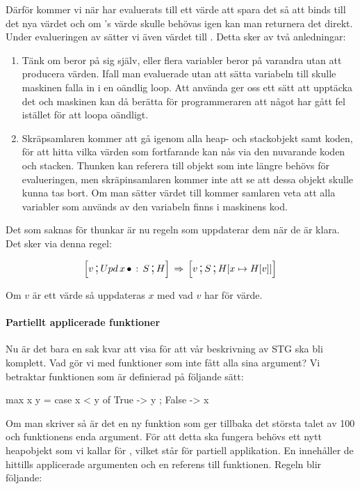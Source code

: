 \documentclass[../Core]{subfiles}
\begin{document}
Därför kommer vi när  har evaluerats till ett värde att spara
det så att  binds till det nya värdet och om 's värde skulle behövas
igen kan man returnera det direkt. Under evalueringen av  sätter
vi även värdet  till . Detta sker av två anledningar:
\begin{enumerate}
\item Tänk om  beror på sig själv, eller flera variabler beror på varandra utan
att producera värden. Ifall man evaluerade utan att sätta variabeln till 
skulle maskinen falla in i en oändlig loop. Att använda  ger oss ett sätt att
upptäcka det och maskinen kan då berätta för programmeraren att något har gått fel
istället för att loopa oändligt.
\item Skräpsamlaren kommer att gå igenom alla heap- och stackobjekt
samt koden, för att hitta vilka värden som fortfarande kan nås via den nuvarande
koden och stacken. Thunken kan referera till objekt som inte längre
behövs för evalueringen, men skräpinsamlaren kommer inte att se att dessa objekt skulle
kunna tas bort. Om man sätter värdet till 
kommer samlaren veta att alla variabler som används av den variabeln finns
i maskinens kod.
\end{enumerate}
Det som saknas för thunkar är nu regeln som uppdaterar dem när de
är klara. Det sker via denna regel:

\[
\text{\large$$}\Big[v \,\text{\Large;}\, Upd\, x\,\bullet \,:\, S \,\text{\Large;}\, H\Big] \,\Rightarrow\, \text{\large$$}\Big[v \,\text{\Large;}\, S \,\text{\Large;}\, H[x\mapsto H[v]]\Big]
\]

Om $v$ är ett värde så uppdateras $x$ med vad $v$ har för värde.

\paragraph{Partiellt applicerade funktioner} Nu är det bara en sak kvar att visa för att vår beskrivning av STG ska bli komplett.
Vad gör vi med funktioner som inte fått alla sina argument? Vi betraktar funktionen  som är definierad
på följande sätt:

\begin{codeEx}
max x y = case x < y of
    { True  -> y
    ; False -> x
    }
\end{codeEx}

Om man skriver  så är det en ny funktion som
ger tillbaka det största talet av 100 och funktionens enda argument. För att
detta ska fungera behövs ett nytt heapobjekt som vi kallar för , vilket står för partiell
applikation. En  innehåller de hittills applicerade argumenten och en referens till funktionen.
Regeln blir följande:
\end{document}
